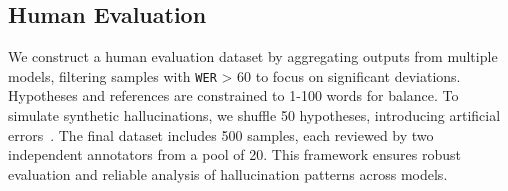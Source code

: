 \subsection{Human Evaluation}
We construct a human evaluation dataset by aggregating outputs from multiple models, filtering samples with \texttt{WER} > 60 to focus on significant deviations. Hypotheses and references are constrained to 1-100 words for balance. To simulate synthetic hallucinations, we shuffle 50 hypotheses, introducing artificial errors~\cite{stiff2019improving}. The final dataset includes 500 samples, each reviewed by two independent annotators from a pool of 20. This framework ensures robust evaluation and reliable analysis of hallucination patterns across models.
